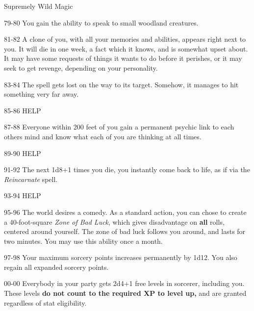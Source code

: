 \begin{rolltable}[0.9\textheight/0pt]{Supremely Wild Magic}
\item[79-80] You gain the ability to speak to small woodland creatures.
\item[81-82] A clone of you, with all your memories and abilities, appears right next to you.
It will die in one week, a fact which it knows, and is somewhat upset about.
It may have some requests of things it wants to do before it perishes, or it may seek to get revenge, depending on your personality.
\item[83-84] The spell gets lost on the way to its target.
Somehow, it manages to hit something very far away.
\item[85-86] HELP
\item[87-88] Everyone within 200 feet of you gain a permanent psychic link to each others mind and know what each of you are thinking at all times.
\item[89-90] HELP
\item[91-92] The next 1d8+1 times you die, you instantly come back to life, as if via the \textit{Reincarnate} spell. 
\item[93-94] HELP
\item[95-96] The world desires a comedy.
As a standard action, you can chose to create a 40-foot-square \textit{Zone of Bad Luck}, which gives disadvantage on \textbf{all} rolls, centered around yourself.
The zone of bad luck follows you around, and lasts for two minutes.
You may use this ability once a month.
\item[97-98] Your maximum sorcery points increases permanently by 1d12.
You also regain all expanded sorcery points.
\item[00-00] Everybody in your party gets 2d4+1 free levels in sorcerer, including you. These levels \textbf{do not count to the required XP to level up,} and are granted regardless of stat eligibility.

\end{rolltable}

